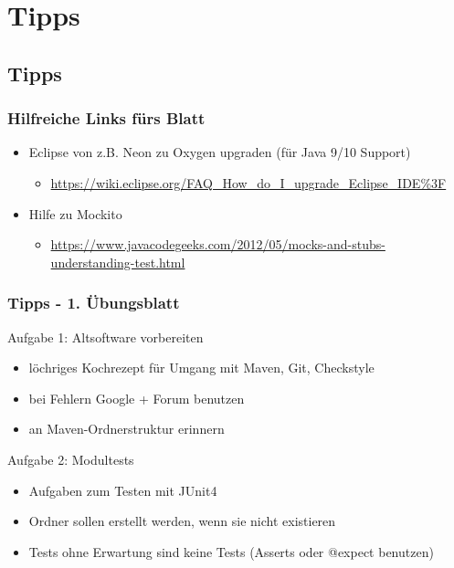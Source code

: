 \documentclass[18pt]{beamer}
\begin{document}
\section{Tipps}
	\subsection{Tipps}
	
	\begin{frame}
		\frametitle{Hilfreiche Links fürs Blatt}
		\begin{itemize}
			\item Eclipse von z.B. Neon zu Oxygen upgraden (für Java 9/10 Support)
			\begin{itemize}
				\item \url{https://wiki.eclipse.org/FAQ\_How\_do\_I\_upgrade\_Eclipse\_IDE\%3F}
			\end{itemize}
			\item Hilfe zu Mockito
			\begin{itemize}
				\item \url{https://www.javacodegeeks.com/2012/05/mocks-and-stubs-understanding-test.html}
			\end{itemize}
		\end{itemize}
\end{frame}
	
	
	\begin{frame}
		\frametitle{Tipps - 1. Übungsblatt}
		\begin{small}
			\begin{exampleblock}{Aufgabe 1: Altsoftware vorbereiten}
				\begin{itemize}
					\item löchriges Kochrezept für Umgang mit Maven, Git, Checkstyle
					\item bei Fehlern Google + Forum benutzen
					\item an Maven-Ordnerstruktur erinnern
				\end{itemize}
			\end{exampleblock}
			\pause
			\begin{exampleblock}{Aufgabe 2: Modultests}
				\begin{itemize}
					\item Aufgaben zum Testen mit JUnit4
					\item Ordner sollen erstellt werden, wenn sie nicht existieren
					\item Tests ohne Erwartung sind keine Tests (Asserts oder @expect benutzen)
				\end{itemize}
			\end{exampleblock}
		\end{small}
	\end{frame}
\end{document}
